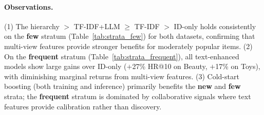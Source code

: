 \paragraph{Observations.}
(1) The hierarchy \model $>$ TF-IDF+LLM $\geq$ TF-IDF $>$ ID-only 
holds consistently on the \textbf{few} stratum (Table~\ref{tab:strata_few})
for both datasets, confirming that multi-view features provide stronger
benefits for moderately popular items.
(2) On the \textbf{frequent} stratum (Table~\ref{tab:strata_frequent}), 
all text-enhanced models show large gains over ID-only ($+$27\% HR@10 on 
Beauty, $+$17\% on Toys), with diminishing marginal returns from 
multi-view features.
(3) Cold-start boosting (both training and inference) primarily benefits 
the \textbf{new} and \textbf{few} strata; the \textbf{frequent} stratum 
is dominated by collaborative signals where text features provide 
calibration rather than discovery.


